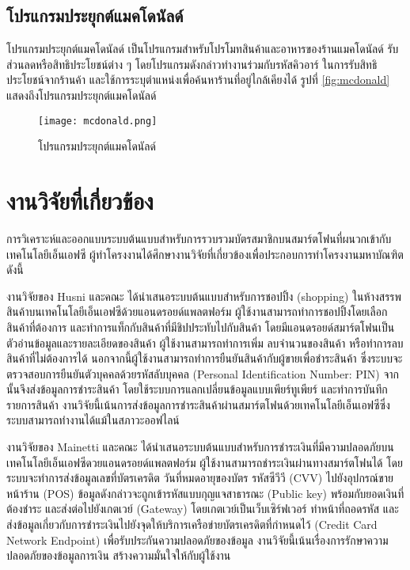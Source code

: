 \documentclass[12pt,a4paper]{article}
\begin{document}
\subsection{โปรแกรมประยุกต์แมคโดนัลด์}
โปรแกรมประยุกต์แมคโดนัลด์ เป็นโปรแกรมสำหรับโปรโมทสินค้าและอาหารของร้านแมคโดนัลด์ รับส่วนลดหรือสิทธิประโยชน์ต่าง ๆ โดยโปรแกรมดังกล่าวทำงานร่วมกับรหัสคิวอาร์ ในการรับสิทธิประโยชน์จากร้านค้า และใช้การระบุตำแหน่งเพื่อค้นหาร้านที่อยู่ไกล้เคียงได้ รูปที่ \ref{fig:mcdonald} แสดงถึงโปรแกรมประยุกต์แมคโดนัลด์ 
\begin{figure}[ht!]
\centering
\texttt{[image: mcdonald.png]}
\caption{โปรแกรมประยุกต์แมคโดนัลด์ \cite{itm:mcdonald}} \label{fig:mcdonald}
\label{overflow}
\end{figure}

\section{งานวิจัยที่เกี่ยวข้อง}
การวิเคราะห์และออกแบบระบบต้นแบบสำหรับการรวบรวมบัตรสมาชิกบนสมาร์ตโฟนที่ผนวกเข้ากับเทคโนโลยีเอ็นเอฟซี ผู้ทำโครงงานได้ศึกษางานวิจัยที่เกี่ยวข้องเพื่อประ\mbox{กอบ}การทําโครงงานมหาบัณฑิต ดังนี้

งานวิจัยของ Husni และคณะ \cite{itm:shopping} ได้นำเสนอระบบต้นแบบสำหรับการชอปปิ้ง (shopping) ในห้างสรรพสินค้าบนเทคโนโลยีเอ็นเอฟซีด้วยแอนดรอยด์แพลตฟอร์ม ผู้ใช้งานสามารถทำการชอปปิ้งโดยเลือกสินค้าที่ต้องการ และทำการแท็กกับสินค้าที่มีชิปประทับไปกับสินค้า โดยมีแอนดรอยด์สมาร์ตโฟนเป็นตัวอ่านข้อมูลและรายละเอียดของสินค้า ผู้ใช้งานสามารถทำการเพิ่ม ลบจำนวนของสินค้า หรือทำการลบสินค้าที่ไม่ต้องการได้ นอกจากนี้ผู้ใช้งานสามารถทำการยืนยันสินค้ากับผู้ขายเพื่อชำระสินค้า ซึ่งระบบจะตรวจสอบการยืนยันตัวบุคคลด้วยรหัสลับบุคคล (Personal Identification Number: PIN) จากนั้นจึงส่งข้อมูลการชำระสินค้า โดยใช้ระบบการแลกเปลี่ยนข้อมูลแบบเพียร์ทูเพียร์ และทำการบันทึกรายการสินค้า งานวิจัยนี้เน้นการส่งข้อมูลการชำระสินค้าผ่านสมาร์ตโฟนด้วยเทคโนโลยีเอ็นเอฟซีซึ่งระบบสามารถทำงานได้แม้ในสภาวะออฟไลน์

งานวิจัยของ Mainetti และคณะ \cite{itm:IDA-Pay} ได้นำเสนอระบบต้นแบบสำหรับการชำระเงินที่มีความปลอดภัยบนเทคโนโลยีเอ็นเอฟซีดวยแอนดรอยด์แพลตฟอร์ม ผู้ใช้งานสามารถชำระเงินผ่านทางสมาร์ตโฟนได้ โดยระบบจะทำการส่งข้อมูลเลขที่บัตรเครดิต วันที่หมดอายุของบัตร รหัสซีวีวี (CVV) ไปยังอุปกรณ์ขายหน้าร้าน (POS) ข้อมูลดังกล่าวจะถูกเข้ารหัสแบบกุญแจสาธารณะ (Public key) พร้อมกับยอดเงินที่ต้องชำระ และส่งต่อไปยังเกตเวย์ (Gateway) โดยเกตเวย์เป็นเว็บเซิร์ฟเวอร์ ทำหน้าที่ถอดรหัส และส่งข้อมูลเกี่ยวกับการชำระเงินไปยังจุดให้บริการเครือข่ายบัตรเครดิตที่กำหนดไว้ (Credit Card Network Endpoint) เพื่อรับประกันความปลอดภัยของข้อมูล งานวิจัยนี้เน้นเรื่องการรักษาความปลอดภัยของข้อมูลการเงิน สร้างความมั่นใจให้กับผู้ใช้งาน
\end{document}

